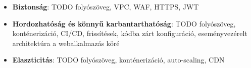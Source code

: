 \begin{itemize}
  \item \textbf{Biztonság}: TODO folyószöveg, VPC, WAF, HTTPS, JWT
  \item \textbf{Hordozhatóság és könnyű karbantarthatóság}: TODO folyószöveg, konténerizáció, CI/CD, frissítések, kódba zárt konfiguráció, eseményvezérelt architektúra a webalkalmazás köré
  \item \textbf{Elaszticitás}: TODO folyószöveg, konténerizáció, auto-scaling, CDN
\end{itemize}

